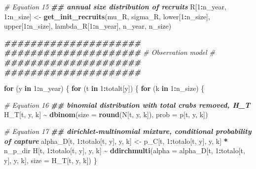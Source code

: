 \documentclass[
]{article}
\newenvironment{Shaded}{\begin{snugshade}}{\end{snugshade}}
\newcommand{\AttributeTok}[1]{\textcolor[rgb]{0.13,0.29,0.53}{#1}}
\newcommand{\CommentTok}[1]{\textcolor[rgb]{0.56,0.35,0.01}{\textit{#1}}}
\newcommand{\ControlFlowTok}[1]{\textcolor[rgb]{0.13,0.29,0.53}{\textbf{#1}}}
\newcommand{\DecValTok}[1]{\textcolor[rgb]{0.00,0.00,0.81}{#1}}
\newcommand{\DocumentationTok}[1]{\textcolor[rgb]{0.56,0.35,0.01}{\textbf{\textit{#1}}}}
\newcommand{\FunctionTok}[1]{\textcolor[rgb]{0.13,0.29,0.53}{\textbf{#1}}}
\newcommand{\NormalTok}[1]{#1}
\newcommand{\OtherTok}[1]{\textcolor[rgb]{0.56,0.35,0.01}{#1}}
\newcommand{\SpecialCharTok}[1]{\textcolor[rgb]{0.81,0.36,0.00}{\textbf{#1}}}
\begin{document}
\begin{Shaded}
\begin{Highlighting}[]
  \CommentTok{\# Equation 15}
  \DocumentationTok{\#\# annual size distribution of recruits}
\NormalTok{  R[}\DecValTok{1}\SpecialCharTok{:}\NormalTok{n\_year, }\DecValTok{1}\SpecialCharTok{:}\NormalTok{n\_size] }\OtherTok{\textless{}{-}} \FunctionTok{get\_init\_recruits}\NormalTok{(mu\_R, sigma\_R, lower[}\DecValTok{1}\SpecialCharTok{:}\NormalTok{n\_size],}
\NormalTok{                                             upper[}\DecValTok{1}\SpecialCharTok{:}\NormalTok{n\_size],}
\NormalTok{                                             lambda\_R[}\DecValTok{1}\SpecialCharTok{:}\NormalTok{n\_year], n\_year,}
\NormalTok{                                             n\_size)}


  \DocumentationTok{\#\#\#\#\#\#\#\#\#\#\#\#\#\#\#\#\#\#\#\#\#}
  \DocumentationTok{\#\#\#\#\#\#\#\#\#\#\#\#\#\#\#\#\#\#\#\#\#}
  \CommentTok{\# Observation model \#}
  \DocumentationTok{\#\#\#\#\#\#\#\#\#\#\#\#\#\#\#\#\#\#\#\#\#}
  \DocumentationTok{\#\#\#\#\#\#\#\#\#\#\#\#\#\#\#\#\#\#\#\#\#}

  \ControlFlowTok{for}\NormalTok{ (y }\ControlFlowTok{in} \DecValTok{1}\SpecialCharTok{:}\NormalTok{n\_year) \{}
    \ControlFlowTok{for}\NormalTok{ (t }\ControlFlowTok{in} \DecValTok{1}\SpecialCharTok{:}\NormalTok{totalt[y]) \{}
      \ControlFlowTok{for}\NormalTok{ (k }\ControlFlowTok{in} \DecValTok{1}\SpecialCharTok{:}\NormalTok{n\_size) \{}

        \CommentTok{\# Equation 16}
        \DocumentationTok{\#\# binomial distribution with total crabs removed, H\_T}
\NormalTok{        H\_T[t, y, k] }\SpecialCharTok{\textasciitilde{}} \FunctionTok{dbinom}\NormalTok{(}\AttributeTok{size =} \FunctionTok{round}\NormalTok{(N[t, y, k]), }\AttributeTok{prob =}\NormalTok{ p[t, y, k])}

        \CommentTok{\# Equation 17}
        \DocumentationTok{\#\# dirichlet{-}multinomial mixture, conditional probability of capture}
\NormalTok{        alpha\_D[t, }\DecValTok{1}\SpecialCharTok{:}\NormalTok{totalo[t, y], y, k] }\OtherTok{\textless{}{-}}\NormalTok{ p\_C[t, }\DecValTok{1}\SpecialCharTok{:}\NormalTok{totalo[t, y],}
\NormalTok{                                                y, k] }\SpecialCharTok{*}\NormalTok{ n\_p\_dir}
\NormalTok{        H[t, }\DecValTok{1}\SpecialCharTok{:}\NormalTok{totalo[t, y],}
\NormalTok{            y, k] }\SpecialCharTok{\textasciitilde{}} \FunctionTok{ddirchmulti}\NormalTok{(}\AttributeTok{alpha =}\NormalTok{ alpha\_D[t, }\DecValTok{1}\SpecialCharTok{:}\NormalTok{totalo[t, y], y, k],}
                                \AttributeTok{size =}\NormalTok{ H\_T[t, y, k])}
\NormalTok{      \}}


\end{Highlighting}
\end{Shaded}
\end{document}
